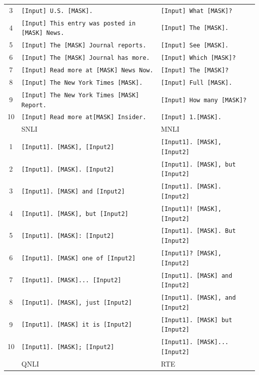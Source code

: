 \documentclass{article}
\theoremstyle{plain}
\theoremstyle{definition}
\theoremstyle{remark}
\begin{document}
\begin{table}[t]
{\begin{tabular}{c|l|l}
        3 &\texttt{[Input] U.S. [MASK].} & \texttt{[Input] What [MASK]?}\\
        4 &\texttt{[Input]  This entry was posted in [MASK] News.} & \texttt{[Input] The [MASK].} \\
        5 &\texttt{[Input] The [MASK] Journal reports.} & \texttt{[Input] See [MASK].} \\
        6 &\texttt{[Input] The [MASK] Journal has more.} & \texttt{[Input] Which [MASK]?} \\
        7 &\texttt{[Input] Read more at [MASK] News Now.} & \texttt{[Input] The [MASK]?} \\
        8 &\texttt{[Input] The New York Times [MASK].} & \texttt{[Input] Full [MASK].} \\
        9 &\texttt{[Input] The New York Times [MASK] Report.} & \texttt{[Input] How many [MASK]?}  \\
        10 &\texttt{[Input] Read more at[MASK] Insider.} & \texttt{[Input] 1.[MASK].}  \\
    \midrule
        & \quad \quad \quad \quad \quad \quad \quad \quad SNLI & \quad \quad \quad \quad \quad \quad \quad \quad MNLI \\
    \midrule
        1 &\texttt{[Input1]. [MASK], [Input2]} &  \texttt{[Input1]. [MASK], [Input2]}\\
        2 &\texttt{[Input1]. [MASK]. [Input2]}& \texttt{[Input1]. [MASK], but [Input2]}\\
        3 &\texttt{[Input1]. [MASK] and [Input2]} & \texttt{[Input1]. [MASK]. [Input2]}\\
        4 &\texttt{[Input1]. [MASK], but [Input2]} & \texttt{[Input1]! [MASK], [Input2]} \\
        5 &\texttt{[Input1]. [MASK]: [Input2]} & \texttt{[Input1]. [MASK]. But [Input2]} \\
        6 &\texttt{[Input1]. [MASK] one of [Input2]}& \texttt{[Input1]? [MASK], [Input2]} \\
        7 &\texttt{[Input1]. [MASK]... [Input2]}& \texttt{[Input1]. [MASK] and [Input2]}\\
        8 &\texttt{[Input1]. [MASK], just [Input2]} & \texttt{[Input1]. [MASK], and [Input2]} \\
        9 &\texttt{[Input1]. [MASK] it is [Input2]} &\texttt{[Input1]. [MASK] but [Input2]} \\
        10 &\texttt{[Input1]. [MASK]; [Input2]} &\texttt{[Input1]. [MASK]... [Input2]} \\
    \midrule
        & \quad \quad \quad \quad \quad \quad \quad \quad QNLI & \quad \quad \quad \quad \quad \quad \quad \quad RTE \\

\end{tabular}}
\end{table}
\end{document}
